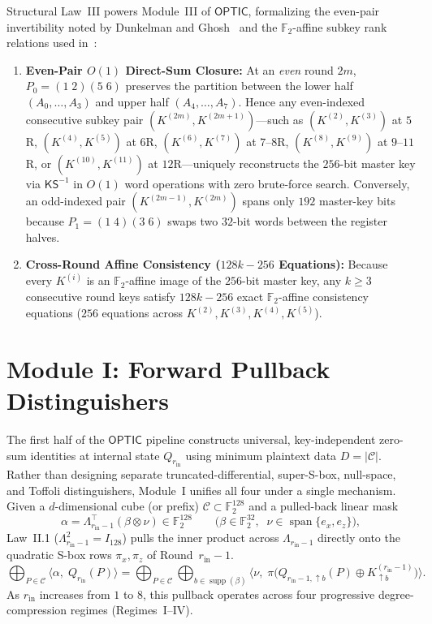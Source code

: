 \documentclass[11pt,a4paper]{article}
\theoremstyle{definition}
\theoremstyle{remark}
\newcommand{\Ftwo}{\mathbb{F}_2}
\newcommand{\OPTIC}{\mathsf{OPTIC}}
\newcommand{\supp}{\operatorname{supp}}
\newcommand{\spanF}{\operatorname{span}}
\begin{document}
Structural Law~III powers Module~III of $\OPTIC$, formalizing the even-pair invertibility noted by Dunkelman and Ghosh~\cite[Remark~5]{DG25} and the $\Ftwo$-affine subkey rank relations used in~\cite{DG25,GMNP25,BNS26,LST26}:
\begin{enumerate}[label=(III.\arabic*),leftmargin=2.2em,nosep]
    \item \textbf{Even-Pair $O(1)$ Direct-Sum Closure:} At an \emph{even} round $2m$, $P_0 = (1\;2)(5\;6)$ preserves the partition between the lower half $(A_0,\dots,A_3)$ and upper half $(A_4,\dots,A_7)$. Hence any even-indexed consecutive subkey pair $(K^{(2m)}, K^{(2m+1)})$---such as $(K^{(2)}, K^{(3)})$ at $5$R, $(K^{(4)}, K^{(5)})$ at $6$R, $(K^{(6)}, K^{(7)})$ at $7$--$8$R, $(K^{(8)}, K^{(9)})$ at $9$--$11$R, or $(K^{(10)}, K^{(11)})$ at $12$R---uniquely reconstructs the $256$-bit master key via $\mathsf{KS}^{-1}$ in $O(1)$ word operations with zero brute-force search. Conversely, an odd-indexed pair $(K^{(2m-1)}, K^{(2m)})$ spans only $192$ master-key bits because $P_1 = (1\;4)(3\;6)$ swaps two $32$-bit words between the register halves.
    \item \textbf{Cross-Round Affine Consistency ($128k - 256$ Equations):} Because every $K^{(i)}$ is an $\Ftwo$-affine image of the $256$-bit master key, any $k \ge 3$ consecutive round keys satisfy $128k - 256$ exact $\Ftwo$-affine consistency equations ($256$ equations across $K^{(2)}, K^{(3)}, K^{(4)}, K^{(5)}$).
\end{enumerate}

\section{Module I: Forward Pullback Distinguishers}
\label{sec:forward-engine}
\label{sec:5round}
\label{sec:6round}

The first half of the $\OPTIC$ pipeline constructs universal, key-independent zero-sum identities at internal state $Q_{r_{\text{in}}}$ using minimum plaintext data $D = |\mathcal{C}|$. Rather than designing separate truncated-differential, super-S-box, null-space, and Toffoli distinguishers, Module~I unifies all four under a single mechanism. Given a $d$-dimensional cube (or prefix) $\mathcal{C} \subset \Ftwo^{128}$ and a pulled-back linear mask
\begin{equation}
\label{eq:unified-pullback}
\alpha = \Lambda_{r_{\text{in}}-1}^\top(\beta \otimes \nu) \in \Ftwo^{128} \qquad \bigl(\beta \in \Ftwo^{32},\;\; \nu \in \spanF\{e_x, e_z\}\bigr),
\end{equation}
Law~II.1 ($\Lambda_{r_{\text{in}}-1}^2 = I_{128}$) pulls the inner product across $\Lambda_{r_{\text{in}}-1}$ directly onto the quadratic S-box rows $\pi_x, \pi_z$ of Round~$r_{\text{in}}-1$.
\[
\bigoplus_{P \in \mathcal{C}} \bigl\langle \alpha,\; Q_{r_{\text{in}}}(P) \bigr\rangle
= \bigoplus_{P \in \mathcal{C}} \bigoplus_{b \in \supp(\beta)} \bigl\langle \nu,\; \pi\bigl(Q_{r_{\text{in}}-1,\uparrow b}(P) \oplus K^{(r_{\text{in}}-1)}_{\uparrow b}\bigr) \bigr\rangle.
\]
As $r_{\text{in}}$ increases from $1$ to $8$, this pullback operates across four progressive degree-compression regimes (Regimes~I--IV).
\end{document}
